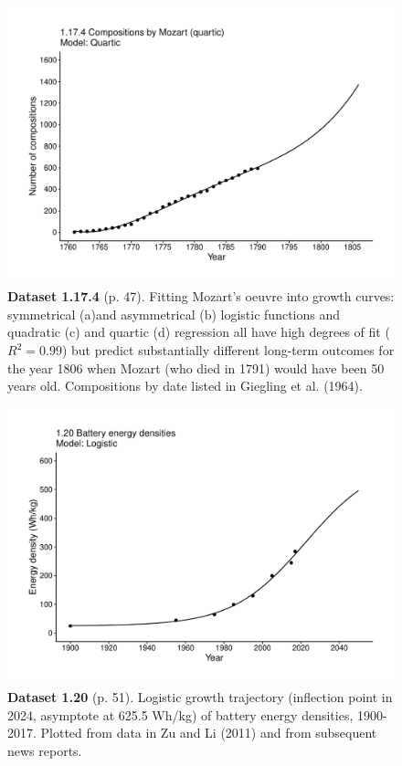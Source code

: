 \documentclass[aps,rmp,preprint,superscriptaddress,10pt,onecolumn]{article}
\begin{document}
\clearpage
\begin{figure}[h]
\includegraphics[width=\textwidth]{output/figs-ggplot/1.17.4.pdf}
\caption*{\textbf{Dataset 1.17.4} (p. 47). Fitting Mozart's oeuvre into growth curves: symmetrical (a)and asymmetrical (b) logistic functions and quadratic (c) and quartic (d) regression all have high degrees of fit ($R^2=0.99$) but predict substantially different long-term outcomes for the year 1806 when Mozart (who died in 1791) would have been 50 years old. Compositions by date listed in Giegling et al. (1964).}
\end{figure}
	
\clearpage
\begin{figure}[h]
\includegraphics[width=\textwidth]{output/figs-ggplot/1.20.pdf}
\caption*{\textbf{Dataset 1.20} (p. 51). Logistic growth trajectory (inflection point in 2024, asymptote at 625.5 Wh/kg) of battery energy densities, 1900-2017. Plotted from data in Zu and Li (2011) and from subsequent news reports. }
\end{figure}
	
\end{document}
